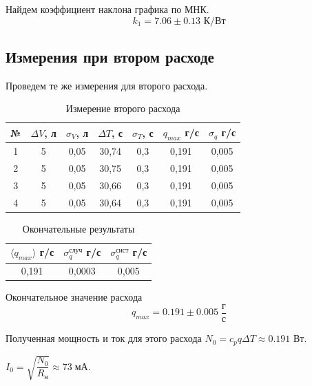 \documentclass[a4paper,12pt]{article}
\begin{document}
Найдем коэффициент наклона графика по МНК. 
\[ k_{1} = 7.06 \pm  0.13  \text{ К/Вт} \] 


\subsection*{Измерения при втором расходе}
Проведем те же измерения для второго расхода. 
\begin{table}[H]
    \centering
    \begin{tabular}{|c|c|c|c|c|c|c|}
    \hline
        № & $\Delta V$, л & $\sigma_V$, л & $\Delta T$, с & $\sigma_T$, с & $q_{max}$ г/с & $\sigma_q$ г/с \\ \hline
        1 & 5 & 0,05 & 30,74 & 0,3 & 0,191 & 0,005 \\ \hline
        2 & 5 & 0,05 & 30,75 & 0,3 & 0,191 & 0,005 \\ \hline
        3 & 5 & 0,05 & 30,66 & 0,3 & 0,191 & 0,005 \\ \hline
        4 & 5 & 0,05 & 30,64 & 0,3 & 0,191 & 0,005 \\ \hline
    \end{tabular}
    \caption{Измерение второго расхода}
\end{table}

\begin{table}[H]
    \centering
    \begin{tabular}{|c|c|c|}
    \hline
        $\langle q_{max} \rangle $ г/с & $\sigma_q^{случ}$ г/с & $\sigma_q^{сист}$ г/с \\ \hline
        0,191 & 0,0003 & 0,005 \\ \hline
    \end{tabular}
    \caption{Окончательные результаты}
\end{table}

Окончательное значение расхода 
\[ q_{max} = 0.191 \pm 0.005 \; \frac{г}{с} \] 

Полученная мощность и ток для этого расхода $N_{0} = c_{p}q\Delta T \approx 0.191$ Вт.

$I_{0} = \sqrt{\dfrac{N_0}{R_н}} \approx 73 \; {мА}.$
	
\end{document}
